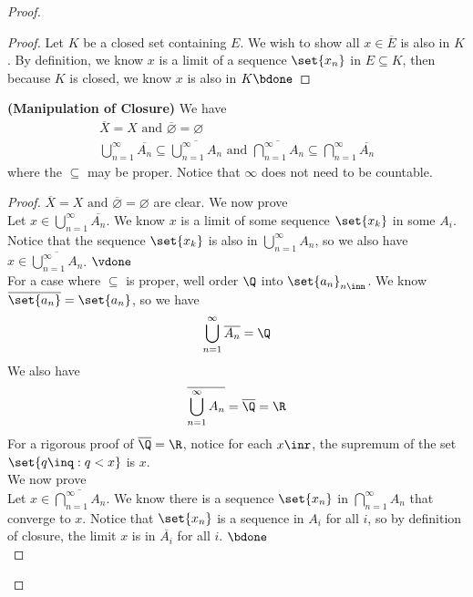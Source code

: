 \documentclass{report}
\begin{document}
\begin{proof}
\begin{proof}
Let $K$ be a closed set containing  $E$. We wish to show all $x\in \overline{E}$ is also in $K$. By definition, we know  $x$ is a limit of a sequence  $\set{x_n}$ in $E\subseteq K$, then because $K$ is closed, we know $x$ is also in $K\bdone$  
\end{proof}
\begin{theorem}
\label{3.2.3}
\textbf{(Manipulation of Closure)} We have
\begin{gather*}
\overline{X}=X\text{ and }\overline{\varnothing}=\varnothing\\
\bigcup_{n=1}^\infty \overline{A_n}\subseteq \overline{\bigcup_{n=1}^\infty A_n}\text{ and }\overline{\bigcap_{n=1}^\infty A_n}\subseteq \bigcap_{n=1}^\infty \overline{A_n} 
\end{gather*}
where the $\subseteq$ may be proper. Notice that $\infty$ does not need to be countable. 
\end{theorem}
\begin{proof}
$\overline{X}=X\text{ and }\overline{\varnothing}=\varnothing$ are clear. We now prove  \\

Let $x\in \bigcup_{n=1}^\infty \overline{A_n}$. We know $x$ is a limit of some sequence $\set{x_k}$ in some $A_i$. Notice that the sequence $\set{x_k}$ is also in $\bigcup_{n=1}^\infty A_n$, so we also have $x\in \overline{\bigcup_{n=1}^\infty A_n}$. $\vdone$\\

For a case where $\subseteq$ is proper, well order $\Q$ into $\set{a_n}_{n\inn}$. We know $\overline{\set{a_n}}=\set{a_n}$, so we have
\begin{equation*}
\bigcup _{n=1}^\infty \overline{A_n}=\Q 
\end{equation*}
We also have
\begin{equation*}
\overline{\bigcup_{n=1}^\infty A_n}=\overline{\Q}=\R
\end{equation*}
For a rigorous proof of $\overline{\Q}=\R$, notice for each $x\inr$, the supremum of the set $\set{q\inq: q<x}$ is $x$.\\

We now prove \\

Let $x\in \overline{\bigcap _{n=1}^\infty A_n}$. We know there is a sequence $\set{x_n}$ in $\bigcap _{n=1}^\infty A_n$ that converge to $x$. Notice that $\set{x_n}$ is a sequence in $A_i$ for all  $i$, so by definition of closure, the limit  $x$ is in  $\overline{A_i}$ for all $i$. $\bdone$\\


\end{proof}
\end{proof}
\end{document}
